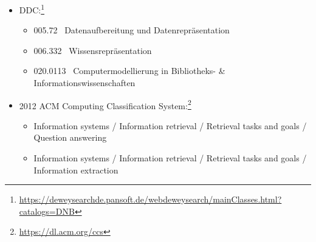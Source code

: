 \documentclass[%
  11pt,
  DIV=16,
  a4paper,
  BCOR=15mm,
  twoside=on,
  bibliography=totoc,
  headings=normal,
  numbers=noendperiod,
]{scrartcl}
\begin{document}
\begin{itemize}
  \item 
    DDC:\footnote{\url{https://deweysearchde.pansoft.de/webdeweysearch/mainClasses.html?catalogs=DNB}}
    \begin{itemize}
      \item
        005.72~
        Datenaufbereitung und Datenrepräsentation
      \item
        006.332~
        Wissensrepräsentation
      \item
        020.0113~
        Computermodellierung in Bibliotheks- \& Informationswissenschaften
    \end{itemize}  
  \item 
    2012 ACM Computing Classification System:\footnote{\url{https://dl.acm.org/ccs}}
%    
%    
%    
    \begin{itemize}
      \item 
        Information systems / Information retrieval / Retrieval tasks and goals / Question answering
      \item 
        Information systems / Information retrieval / Retrieval tasks and goals / Information extraction
    \end{itemize}
\end{itemize}
\end{document}
